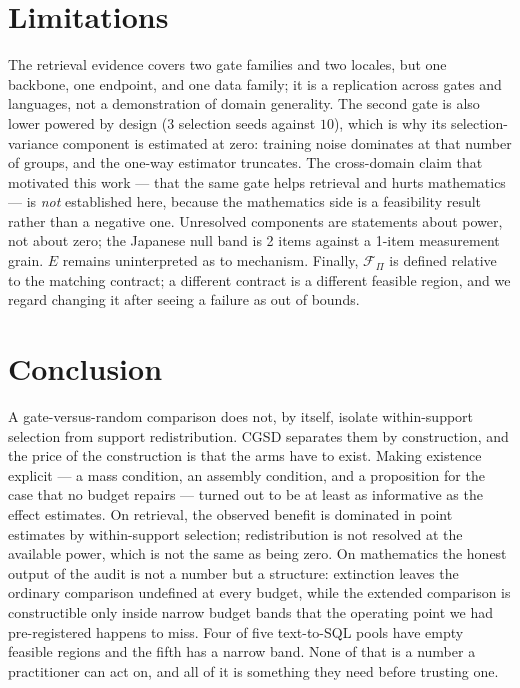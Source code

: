 \documentclass[10pt,twocolumn]{article}
\newcommand{\Fset}{\mathcal{F}}
\begin{document}
\section{Limitations}

The retrieval evidence covers two gate families and two locales, but one backbone, one endpoint,
and one data family; it is a replication across gates and languages, not a demonstration of
domain generality. The second gate is also lower powered by design ($3$ selection seeds against
$10$), which is why its selection-variance component is estimated at zero: training noise
dominates at that number of groups, and the one-way estimator truncates. The cross-domain claim
that motivated this work --- that the same gate helps retrieval and hurts mathematics --- is
\emph{not} established here, because the mathematics side is a feasibility result rather than a
negative one. Unresolved components are statements about power, not about zero; the
Japanese null band is 2 items against a 1-item measurement grain. $E$ remains uninterpreted as
to mechanism. Finally, $\Fset_\Pi$ is defined relative to the matching contract; a different
contract is a different feasible region, and we regard changing it after seeing a failure as
out of bounds.

\section{Conclusion}

A gate-versus-random comparison does not, by itself, isolate within-support selection from
support redistribution. CGSD separates them by construction, and the price of the construction
is that the arms have to exist. Making existence explicit --- a mass condition, an assembly
condition, and a proposition for the case that no budget repairs --- turned out to be at least
as informative as the effect estimates. On retrieval, the observed benefit is
dominated in point estimates by within-support selection; redistribution is not resolved at the
available power, which is not the same as being zero. On mathematics the honest output of the audit is not a number but a
structure: extinction leaves the ordinary comparison undefined at every budget, while the extended
comparison is constructible only inside narrow budget bands that the operating point we had
pre-registered happens to miss. Four of five text-to-SQL pools have empty feasible regions and the
fifth has a narrow band. None of that is a number a practitioner can act on, and all of it is
something they need before trusting one.
\end{document}
